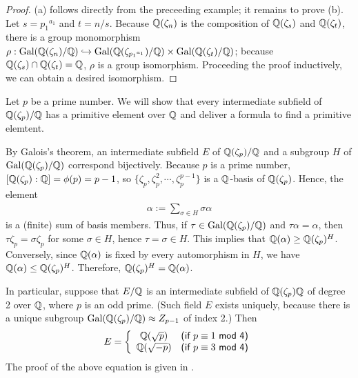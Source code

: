 \begin{proof}
    (a) follows directly from the preceeding example; it remains to prove (b).
    Let $s={p_1}^{a_1}$ and $t=n/s$.
    Because ${\mathbb{Q}}(\zeta_n)$ is the composition of ${\mathbb{Q}}(\zeta_s)$ and ${\mathbb{Q}}(\zeta_t)$, there is a group monomorphism $\rho: {\textrm{Gal}({{\mathbb{Q}}(\zeta_n)/{\mathbb{Q}}})}\hookrightarrow{\textrm{Gal}({{\mathbb{Q}}(\zeta_{{p_1}^{a_1}})/{\mathbb{Q}}})}\times{\textrm{Gal}({{\mathbb{Q}}(\zeta_t)/{\mathbb{Q}}})}$; because ${\mathbb{Q}}(\zeta_s)\cap{\mathbb{Q}}(\zeta_t)={\mathbb{Q}}$, $\rho$ is a group isomorphism.
    Proceeding the proof inductively, we can obtain a desired isomorphism.
\end{proof}

\begin{obs}
    Let $p$ be a prime number.
    We will show that every intermediate subfield of ${\mathbb{Q}}(\zeta_p)/{\mathbb{Q}}$ has a primitive element over ${\mathbb{Q}}$ and deliver a formula to find a primitive elemtent.

    By Galois's theorem, an intermediate subfield $E$ of ${\mathbb{Q}}(\zeta_p)/{\mathbb{Q}}$ and a subgroup $H$ of ${\textrm{Gal}({{\mathbb{Q}}(\zeta_p)/{\mathbb{Q}}})}$ correspond bijectively.
    Because $p$ is a prime number, $[{\mathbb{Q}}(\zeta_p):{\mathbb{Q}}]=\phi(p)=p-1$, so $\{\zeta_p, \zeta_p^2, \cdots, \zeta_p^{p-1}\}$ is a ${\mathbb{Q}}$-basis of ${\mathbb{Q}}(\zeta_p)$.
    Hence, the element
    \begin{align*}
        \alpha:=\sum_{\sigma\in H}\sigma\alpha
    \end{align*}
    is a (finite) sum of basis members.
    Thus, if $\tau\in{\textrm{Gal}({{\mathbb{Q}}(\zeta_p)/{\mathbb{Q}}})}$ and $\tau\alpha=\alpha$, then $\tau\zeta
    _p=\sigma\zeta_p$ for some $\sigma\in H$, hence $\tau=\sigma\in H$.
    This implies that ${\mathbb{Q}}(\alpha)\geq{\mathbb{Q}}(\zeta_p)^H$.
    Conversely, since ${\mathbb{Q}}(\alpha)$ is fixed by every automorphism in $H$, we have ${\mathbb{Q}}(\alpha)\leq{\mathbb{Q}}(\zeta_p)^H$.
    Therefore, ${\mathbb{Q}}(\zeta_p)^H={\mathbb{Q}}(\alpha)$.
    
    In particular, suppose that $E/{\mathbb{Q}}$ is an intermediate subfield of ${\mathbb{Q}}(\zeta_p){\mathbb{Q}}$ of degree 2 over ${\mathbb{Q}}$, where $p$ is an odd prime.
    (Such field $E$ exists uniquely, because there is a unique subgroup ${\textrm{Gal}({{\mathbb{Q}}(\zeta_p)/{\mathbb{Q}}})}\approx Z_{p-1}$ of index 2.)
    Then
    \begin{align}\label{quadratic_cyclotomic_extension_over_Q}
        E=\left\{\begin{array}{cc}
            {\mathbb{Q}}(\sqrt{p})    &  \textsf{(if $p\equiv 1$ mod 4)}\\
            {\mathbb{Q}}(\sqrt{-p})    &  \textsf{(if $p\equiv 3$ mod 4)}
        \end{array}\right.
    \end{align}
    The proof of the above equation is given in .
\end{obs}

